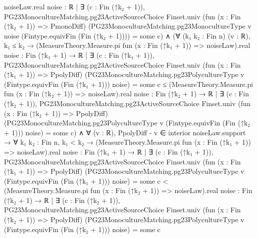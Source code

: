 \documentclass[10pt]{article}
\begin{document}
\begin{ReviewVerbatim}
                      noiseLaw.real
                        {noise : ℝ |
                          ∃ (c : Fin (↑k₂ + 1)),
                            PG23MonocultureMatching.pg23ActiveSourceChoice Finset.univ
                                (fun (x : Fin (↑k₂ + 1)) => PmonoDiff)
                                (PG23MonocultureMatching.pg23MonocultureType v noise
                                  (Fintype.equivFin (Fin (↑k₂ + 1)))) =
                              some c}) ∧
                  (∀ (k₁ k₂ : Fin n) (v : ℝ),
                      k₁ ≤ k₂ →
                        (MeasureTheory.Measure.pi fun (x : Fin (↑k₁ + 1)) => noiseLaw).real
                            {noise : Fin (↑k₁ + 1) → ℝ |
                              ∃ (c : Fin (↑k₁ + 1)),
                                PG23MonocultureMatching.pg23ActiveSourceChoice Finset.univ
                                    (fun (x : Fin (↑k₁ + 1)) => PpolyDiff)
                                    (PG23MonocultureMatching.pg23PolycultureType v (Fintype.equivFin (Fin (↑k₁ + 1)))
                                      noise) =
                                  some c} ≤
                          (MeasureTheory.Measure.pi fun (x : Fin (↑k₂ + 1)) => noiseLaw).real
                            {noise : Fin (↑k₂ + 1) → ℝ |
                              ∃ (c : Fin (↑k₂ + 1)),
                                PG23MonocultureMatching.pg23ActiveSourceChoice Finset.univ
                                    (fun (x : Fin (↑k₂ + 1)) => PpolyDiff)
                                    (PG23MonocultureMatching.pg23PolycultureType v (Fintype.equivFin (Fin (↑k₂ + 1)))
                                      noise) =
                                  some c}) ∧
                    ∀ (v : ℝ),
                      PpolyDiff - v ∈ interior noiseLaw.support →
                        ∀ {k₁ k₂ : Fin n},
                          k₁ < k₂ →
                            (MeasureTheory.Measure.pi fun (x : Fin (↑k₁ + 1)) => noiseLaw).real
                                {noise : Fin (↑k₁ + 1) → ℝ |
                                  ∃ (c : Fin (↑k₁ + 1)),
                                    PG23MonocultureMatching.pg23ActiveSourceChoice Finset.univ
                                        (fun (x : Fin (↑k₁ + 1)) => PpolyDiff)
                                        (PG23MonocultureMatching.pg23PolycultureType v
                                          (Fintype.equivFin (Fin (↑k₁ + 1))) noise) =
                                      some c} <
                              (MeasureTheory.Measure.pi fun (x : Fin (↑k₂ + 1)) => noiseLaw).real
                                {noise : Fin (↑k₂ + 1) → ℝ |
                                  ∃ (c : Fin (↑k₂ + 1)),
                                    PG23MonocultureMatching.pg23ActiveSourceChoice Finset.univ
                                        (fun (x : Fin (↑k₂ + 1)) => PpolyDiff)
                                        (PG23MonocultureMatching.pg23PolycultureType v
                                          (Fintype.equivFin (Fin (↑k₂ + 1))) noise) =
                                      some c}
\end{ReviewVerbatim}
\end{document}
